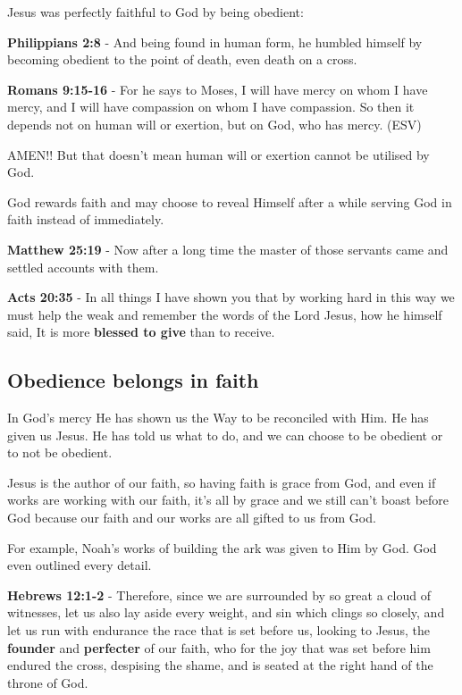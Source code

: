 \documentclass[11pt]{article}
\begin{document}
Jesus was perfectly faithful to God by being obedient:

\textbf{Philippians 2:8} - And being found in human form, he humbled himself by becoming obedient to the point of death, even death on a cross.

\textbf{Romans 9:15-16} - For he says to Moses, I will have mercy on whom I have mercy, and I will have compassion on whom I have compassion. So then it depends not on human will or exertion, but on God, who has mercy. (ESV)

AMEN!! But that doesn't mean human will or exertion cannot be utilised by God.

God rewards faith and may choose to reveal Himself after a while serving God in faith instead of immediately.

\textbf{Matthew 25:19} - Now after a long time the master of those servants came and settled accounts with them.

\textbf{Acts 20:35} - In all things I have shown you that by working hard in this way we must help the weak and remember the words of the Lord Jesus, how he himself said, It is more \textbf{blessed to give} than to receive.

\subsection{Obedience belongs in faith}
\label{sec:orgdfd79c2}
In God's mercy He has shown us the Way to be reconciled with Him. He has given us Jesus. He has told us what to do, and we can choose to be obedient or to not be obedient.

Jesus is the author of our faith, so having faith is grace from God, and even if works are working with our faith, it's all by grace and we still can't boast before God because our faith and our works are all gifted to us from God.

For example, Noah's works of building the ark was given to Him by God. God even outlined every detail.

\textbf{Hebrews 12:1-2} - Therefore, since we are surrounded by so great a cloud of witnesses, let us also lay aside every weight, and sin which clings so closely, and let us run with endurance the race that is set before us, looking to Jesus, the \textbf{founder} and \textbf{perfecter} of our faith, who for the joy that was set before him endured the cross, despising the shame, and is seated at the right hand of the throne of God.
\end{document}
